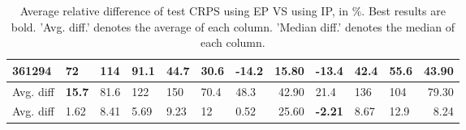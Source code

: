 \begin{table}[ht!]
\begin{tabular}{lllllllrlllr}
  361294 & 72 & 114 & 91.1 & 44.7 & 30.6 & \textbf{-14.2} & 15.80 & -13.4 & 42.4 & 55.6 & 43.90 \\ 
   \hline
Avg. diff & \textbf{15.7} & 81.6 & 122 & 150 & 70.4 & 48.3 & 42.90 & 21.4 & 136 & 104 & 79.30 \\ 
  Avg. diff & 1.62 & 8.41 & 5.69 & 9.23 & 12 & 0.52 & 25.60 & \textbf{-2.21} & 8.67 & 12.9 & 8.24 \\ 
   \hline
\hline
\end{tabular}
\endgroup
\caption{Average relative difference of test CRPS using EP VS using IP, in \%. 
                  Best results are bold. 
                  'Avg. diff.' denotes the average of each column.
                  'Median diff.' denotes the median of each column.} 
\label{TABLES/table_results_CRPS_umap_num_and_cat_features_EP_VS_IP}
\end{table}

